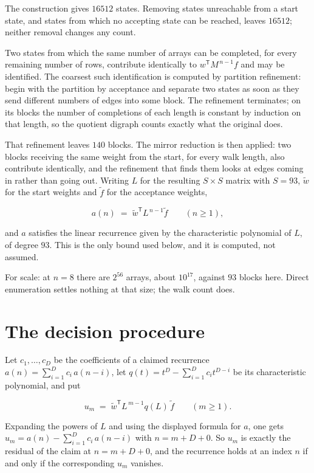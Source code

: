 \documentclass[11pt]{article}
\theoremstyle{definition}
\begin{document}
The construction gives $16512$ states. Removing states unreachable from a start state, and states from which no accepting state can be reached, leaves $16512$; neither removal changes any count.

Two states from which the same number of arrays can be completed, for every remaining number of rows, contribute identically to $w^{\mathsf T}M^{\,n-1}f$ and may be identified. The coarsest such identification is computed by partition refinement: begin with the partition by acceptance and separate two states as soon as they send different numbers of edges into some block. The refinement terminates; on its blocks the number of completions of each length is constant by induction on that length, so the quotient digraph counts exactly what the original does.

That refinement leaves $140$ blocks. The mirror reduction is then applied: two blocks receiving the same weight from the start, for every walk length, also contribute identically, and the refinement that finds them looks at edges coming in rather than going out. Writing $L$ for the resulting $S \times S$ matrix with $S = 93$, $\tilde w$ for the start weights and $\tilde f$ for the acceptance weights,

\[a(n) \;=\; \tilde w^{\mathsf T} L^{\,n-1} \tilde f \qquad (n \ge 1),\]

and $a$ satisfies the linear recurrence given by the characteristic polynomial of $L$, of degree $93$. This is the only bound used below, and it is computed, not assumed.

For scale: at $n = 8$ there are $2^{56}$ arrays, about $10^{17}$, against $93$ blocks here. Direct enumeration settles nothing at that size; the walk count does.

\section{The decision procedure}

Let $c_1,\dots,c_D$ be the coefficients of a claimed recurrence $a(n) = \sum_{i=1}^{D} c_i\,a(n-i)$, let $q(t) = t^{D} - \sum_{i=1}^{D} c_i t^{D-i}$ be its characteristic polynomial, and put

\[u_m \;=\; \tilde w^{\mathsf T} L^{\,m-1} q(L)\,\tilde f \qquad (m \ge 1).\]

Expanding the powers of $L$ and using the displayed formula for $a$, one gets $u_m = a(n) - \sum_{i=1}^{D} c_i\,a(n-i)$ with $n = m + D + 0$. So $u_m$ is exactly the residual of the claim at $n = m + D + 0$, and the recurrence holds at an index $n$ if and only if the corresponding $u_m$ vanishes.
\end{document}
